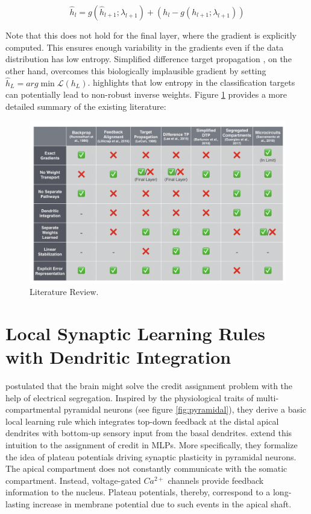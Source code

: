 \documentclass[colorinlistoftodos]{article}
\theoremstyle{definition}
\begin{document}
$$\hat{h}_l = g(\hat{h}_{l+1}; \lambda_{l+1}) + \left(h_l - g(h_{l+1}; \lambda_{l+1})\right)$$

Note that this does not hold for the final layer, where the gradient is explicitly computed. This ensures enough variability in the gradients even if the data distribution has low entropy.
Simplified difference target propagation \citep{bartunov2018}, on the other hand, overcomes this biologically implausible gradient by setting $\hat{h}_L = arg\min \mathcal{L}(h_L)$. \citet{bartunov2018} highlights that low entropy in the classification targets can potentially lead to non-robust inverse weights.
Figure \ref{fig:lit_rev} provides a more detailed summary of the existing literature:

\begin{figure}[H]
	\centering
	\includegraphics[width=\textwidth]{../figures/report/lit_rev}
	\caption{Literature Review.}	\label{fig:lit_rev}
\end{figure}

\newpage
\section{Local Synaptic Learning Rules with Dendritic Integration}

\citet{kording2001} postulated that the brain might solve the credit assignment problem with the help of electrical segregation. Inspired by the physiological traits of multi-compartmental pyramidal neurons (see figure \ref{fig:pyramidal}), they derive a basic local learning rule which integrates top-down feedback at the distal apical dendrites with bottom-up sensory input from the basal dendrites. 
\citet{guerguiev2017} extend this intuition to the assignment of credit in MLPs. More specifically, they formalize the idea of plateau potentials driving synaptic plasticity in pyramidal neurons. The apical compartment does not constantly communicate with the somatic compartment. Instead, voltage-gated $Ca^{2+}$ channels provide feedback information to the nucleus. Plateau potentials, thereby, correspond to a long-lasting increase in membrane potential due to such events in the apical shaft. 
\end{document}
